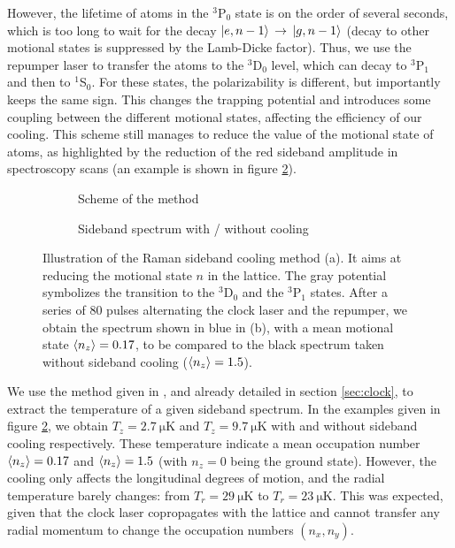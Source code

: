 \documentclass[11pt]{article}
\numberwithin{equation}{section}
\numberwithin{figure}{section}
\begin{document}
However, the lifetime of atoms in the $^3$P$_0$ state is on the order of several seconds, which is too long to wait for the decay $\ket{e, n-1} \, \rightarrow \, \ket{g, n-1}$ (decay to other motional states is suppressed by the Lamb-Dicke factor). Thus, we use the repumper laser to transfer the atoms to the $^3$D$_0$ level, which can decay to $^3$P$_1$ and then to $^1$S$_0$. For these states, the polarizability is different, but importantly keeps the same sign. This changes the trapping potential and introduces some coupling between the different motional states, affecting the efficiency of our cooling. This scheme still manages to reduce the value of the motional state of atoms, as highlighted by the reduction of the red sideband amplitude in spectroscopy scans (an example is shown in figure \ref{fig:sideband_cooling_results}).
%
\begin{figure}[htbp]
	\centering
	\begin{subfigure}[b]{0.4\textwidth}
		\centering
		\small
   		
   		\vspace{0.3cm}
		\caption{\small Scheme of the method}
		\label{fig:sideband_cooling_scheme}
	\end{subfigure}
	\hspace{0.5cm}
	\begin{subfigure}[b]{0.55\textwidth}
    	\centering
    	\small
   		
   		\vspace{-0.1cm}
		\caption{\small Sideband spectrum with / without cooling}
		\label{fig:sideband_cooling_results}
	\end{subfigure}	
	\caption{\small Illustration of the Raman sideband cooling method (a). It aims at reducing the motional state $n$ in the lattice. The gray potential symbolizes the transition to the $^3$D$_0$ and the $^3$P$_1$ states. After a series of $80$ pulses alternating the clock laser and the repumper, we obtain the spectrum shown in blue in (b), with a mean motional state $\expval{n_z} = 0.17$, to be compared to the black spectrum taken without sideband cooling ($\expval{n_z} = 1.5$).}
    \label{fig:sideband_cooling}
\end{figure}
%

We use the method given in \cite{2009_blatt}, and already detailed in section \ref{sec:clock}, to extract the temperature of a given sideband spectrum. In the examples given in figure \ref{fig:sideband_cooling_results}, we obtain $T_z = \SI{2.7}{\micro\kelvin}$ and $T_z = \SI{9.7}{\micro\kelvin}$ with and without sideband cooling respectively. These temperature indicate a mean occupation number $\expval{n_z} = 0.17$ and $\expval{n_z} = 1.5$ (with $n_z = 0$ being the ground state). However, the cooling only affects the longitudinal degrees of motion, and the radial temperature barely changes: from $T_r = \SI{29}{\micro\kelvin}$ to $T_r = \SI{23}{\micro\kelvin}$. This was expected, given that the clock laser copropagates with the lattice and cannot transfer any radial momentum to change the occupation numbers $(n_x, n_y)$.
\end{document}
